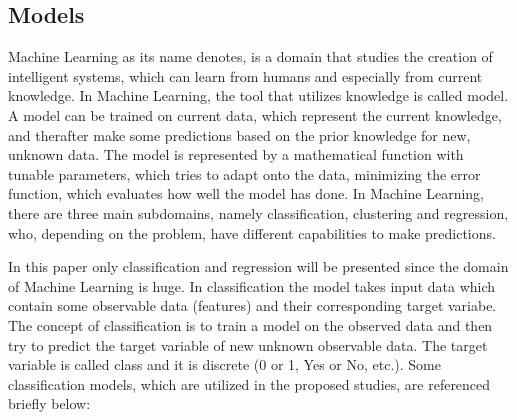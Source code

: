 \documentclass[journal,article,submit,pdftex,moreauthors]{Definitions/mdpi}
\begin{document}
\subsection{Models}
Machine Learning as its name denotes, is a domain that studies the creation of intelligent systems, which can learn from humans and 
especially from current knowledge. In Machine Learning, the tool that utilizes knowledge is called model. A model can be trained
on current data, which represent the current knowledge, and therafter make some predictions based on the prior knowledge for new,
unknown data. The model is represented by a mathematical function with tunable parameters, which tries to adapt onto the data,
minimizing the error function, which evaluates how well the model has done. In Machine Learning, there are three main subdomains,
namely classification, clustering and regression, who, depending on the problem, have different capabilities to make predictions.
\par In this paper only classification and regression will be presented since the domain of Machine Learning is huge. In classification
the model takes input data which contain some observable data (features) and their corresponding target variabe. The concept of classification
is to train a model on the observed data and then try to predict the target variable of new unknown observable data. The target 
variable is called class and it is discrete (0 or 1, Yes or No, etc.). Some classification models, which are utilized in the 
proposed studies, are referenced briefly below:
\end{document}
